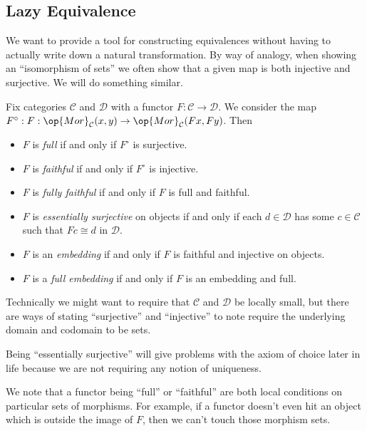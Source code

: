 \documentclass[../notes.tex]{subfiles}
\begin{document}
\subsection{Lazy Equivalence}
We want to provide a tool for constructing equivalences without having to actually write down a natural transformation. By way of analogy, when showing an ``isomorphism of sets'' we often show that a given map is both injective and surjective. We will do something similar.
\begin{definition}
	Fix categories $\mathcal C$ and $\mathcal D$ with a functor $F:\mathcal C\to\mathcal D$. We consider the map $F^\circ:F:\op{Mor}_\mathcal C(x,y)\to\op{Mor}_\mathcal C(Fx,Fy)$. Then
	\begin{itemize}
		\item $F$ is \textit{full} if and only if $F^\circ$ is surjective.
		\item $F$ is \textit{faithful} if and only if $F^\circ$ is injective.
		\item $F$ is \textit{fully faithful} if and only if $F$ is full and faithful.
		\item $F$ is \textit{essentially surjective} on objects if and only if each $d\in\mathcal D$ has some $c\in\mathcal C$ such that $Fc\cong d$ in $\mathcal D$.
		\item $F$ is an \textit{embedding} if and only if $F$ is faithful and injective on objects.
		\item $F$ is a \textit{full embedding} if and only if $F$ is an embedding and full.
	\end{itemize}
\end{definition}
\begin{remark}
	Technically we might want to require that $\mathcal C$ and $\mathcal D$ be locally small, but there are ways of stating ``surjective'' and ``injective'' to note require the underlying domain and codomain to be sets.
\end{remark}
\begin{remark}
	Being ``essentially surjective'' will give problems with the axiom of choice later in life because we are not requiring any notion of uniqueness.
\end{remark}
We note that a functor being ``full'' or ``faithful'' are both local conditions on particular sets of morphisms. For example, if a functor doesn't even hit an object which is outside the image of $F$, then we can't touch those morphism sets.
\end{document}
